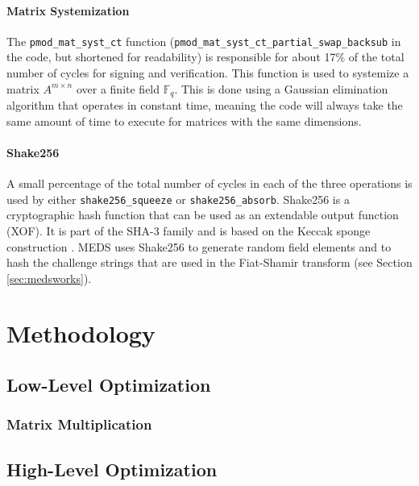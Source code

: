 \documentclass[11pt,a4paper]{report}
\begin{document}
\subsubsection{Matrix Systemization}
The \texttt{pmod\_mat\_syst\_ct} function (\texttt{pmod\_mat\_syst\_ct\_partial\_swap\_backsub} in the code, but shortened for readability) is responsible for about 17\% of the total number of cycles for signing and verification. This function is used to systemize a matrix $A^{m \times n}$ over a finite field $\mathbb{F}_q$. This is done using a Gaussian elimination algorithm that operates in constant time, meaning the code will always take the same amount of time to execute for matrices with the same dimensions.


\subsubsection{Shake256}
A small percentage of the total number of cycles in each of the three operations is used by either \texttt{shake256\_squeeze} or \texttt{shake256\_absorb}. Shake256 is a cryptographic hash function that can be used as an extendable output function (XOF). It is part of the SHA-3 family \cite{dworkin2015sha} and is based on the Keccak sponge construction \cite{bertoni2013keccak}. MEDS uses Shake256 to generate random field elements and to hash the challenge strings that are used in the Fiat-Shamir transform (see Section \ref{sec:medsworks}).

\chapter{Methodology}
\label{ch:methodology}

\section{Low-Level Optimization}

\subsection{Matrix Multiplication}

\section{High-Level Optimization}
\end{document}
